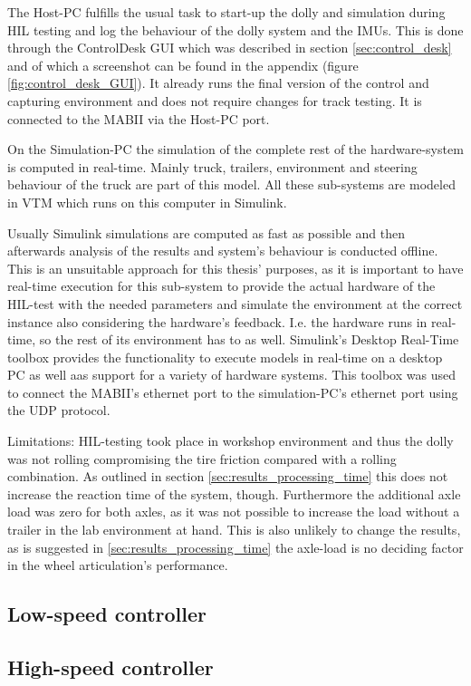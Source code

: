 \documentclass[ExampleMasters.tex]{subfiles}
\begin{document}
The Host-PC fulfills the usual task to start-up the dolly and simulation during HIL testing and log the behaviour of the dolly system and the IMUs. This is done through the ControlDesk GUI which was described in section \ref{sec:control_desk} and of which a screenshot can be found in the appendix (figure \ref{fig:control_desk_GUI}). It already runs the final version of the control and capturing environment and does not require changes for track testing. It is connected to the MABII via the Host-PC port.

On the Simulation-PC the simulation of the complete rest of the hardware-system is computed in real-time. Mainly truck, trailers, environment and steering behaviour of the truck are part of this model. All these sub-systems are modeled in VTM which runs on this computer in Simulink. 

Usually Simulink simulations are computed as fast as possible and then afterwards analysis of the results and system's behaviour is conducted offline. This is an unsuitable approach for this thesis' purposes, as it is important to have real-time execution for this sub-system to provide the actual hardware of the HIL-test with the needed parameters and simulate the environment at the correct instance also considering the hardware's feedback. I.e. the hardware runs in real-time, so the rest of its environment has to as well. Simulink's Desktop Real-Time toolbox provides the functionality to execute models in real-time on a desktop PC as well aas support for a variety of hardware systems. This toolbox was used to connect the MABII's ethernet port to the simulation-PC's ethernet port using the UDP protocol. 

Limitations: HIL-testing took place in workshop environment and thus the dolly was not rolling compromising the tire friction compared with a rolling combination. As outlined in section \ref{sec:results_processing_time} this does not increase the reaction time of the system, though. Furthermore the additional axle load was zero for both axles, as it was not possible to increase the load without a trailer in the lab environment at hand. This is also unlikely to change the results, as is suggested in \ref{sec:results_processing_time} the axle-load is no deciding factor in the wheel articulation's performance. 


\subsection{Low-speed controller}
\subsection{High-speed controller}
\end{document}
